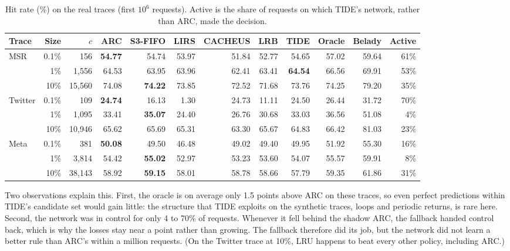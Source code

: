 \documentclass{llncs}
\begin{document}
\begin{table}[htbp]
\centering
\caption{Hit rate (\%) on the real traces (first $10^6$ requests). Active is the share of requests on which TIDE's network, rather than ARC, made the decision.}
\label{tab:real}
\setlength{\tabcolsep}{2.5pt}
\scriptsize
\begin{tabular}{lrrrrrrrrrrr}
\toprule
Trace & Size & $c$ & ARC & S3-FIFO & LIRS & CACHEUS & LRB & TIDE & Oracle & Belady & Active \\
\midrule
MSR & 0.1\% & 156 & \textbf{54.77} & 54.74 & 53.97 & 51.84 & 52.77 & 54.65 & 57.02 & 59.64 & 61\% \\
 & 1\% & 1,556 & 64.53 & 63.95 & 63.96 & 62.41 & 63.41 & \textbf{64.54} & 66.56 & 69.91 & 53\% \\
 & 10\% & 15,560 & 74.08 & \textbf{74.22} & 73.85 & 72.52 & 71.68 & 73.76 & 74.25 & 79.20 & 35\% \\
\midrule
Twitter & 0.1\% & 109 & \textbf{24.74} & 16.13 & 1.30 & 24.73 & 11.11 & 24.50 & 26.44 & 31.72 & 70\% \\
 & 1\% & 1,095 & 33.41 & \textbf{35.07} & 24.40 & 26.76 & 30.68 & 33.03 & 36.56 & 51.08 & 4\% \\
 & 10\% & 10,946 & 65.62 & 65.69 & 65.31 & 63.30 & 65.67 & 64.83 & 66.42 & 81.03 & 23\% \\
\midrule
Meta & 0.1\% & 381 & \textbf{50.08} & 49.50 & 46.48 & 49.02 & 49.40 & 49.95 & 51.92 & 55.30 & 16\% \\
 & 1\% & 3,814 & 54.42 & \textbf{55.02} & 52.97 & 53.23 & 53.60 & 54.07 & 55.57 & 59.91 & 8\% \\
 & 10\% & 38,143 & 58.92 & \textbf{59.15} & 58.01 & 58.78 & 58.66 & 57.79 & 59.35 & 61.86 & 31\% \\
\bottomrule
\end{tabular}
\end{table}

Two observations explain this. First, the oracle is on average only 1.5 points above ARC on these traces, so even perfect predictions within TIDE's candidate set would gain little: the structure that TIDE exploits on the synthetic traces, loops and periodic returns, is rare here. Second, the network was in control for only 4 to 70\% of requests. Whenever it fell behind the shadow ARC, the fallback handed control back, which is why the losses stay near a point rather than growing. The fallback therefore did its job, but the network did not learn a better rule than ARC's within a million requests. (On the Twitter trace at 10\%, LRU happens to beat every other policy, including ARC.)
\end{document}
